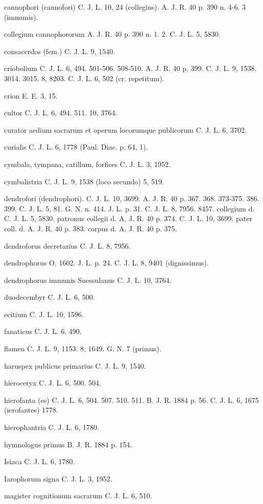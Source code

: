 \documentclass[a4paper, 11pt, oneside, polutonikogreek, german]{article}
\begin{document}
cannophori (cannofori) C. J. L. 10, 24 (collegius). A. J. R. 40 p. 390 n. 4-6. 3 (immunis).

collegium cannophororum A. J. R. 40 p. 390 n. 1. 2. C. J. L. 5, 5830.

consacerdos (fem.) C. J. L. 9, 1540.

criobolium C. J. L. 6, 494. 501-506. 508-510. A. J. R. 40 p. 399. C. J. L. 9, 1538. 3014. 3015. 8, 8203. C. J. L. 6, 502 (cr. repetitum).

crion E. E. 3, 15.

cultor C. J. L. 6, 494. 511. 10, 3764.

curator aedium sacrarum et operum locorumque publicorum C. J. L. 6, 3702.

curialis C. J. L. 6, 1778 (Paul. Diac. p. 64, 1).

cymbala, tympana, catillum, forfices C. J. L. 3, 1952.

cymbalistria C. J. L. 9, 1538 (loco secundo) 5, 519.

dendrofori (dendrophori). C. J. L. 10, 3699. A. J. R. 40 p. 367. 368. 373-375. 386. 399. C. J. L. 5, 81. G. N. n. 414. J. L. p. 31. C. J. L. 8, 7956. 8457. collegium d. C. J. L. 5, 5830. patronus collegii d. A. J. R. 40 p. 374. C. J. L. 10, 3699. pater coll. d. A. J. R. 40 p. 383. corpus d. A. J. R. 40 p. 375.

dendroforus decretarius C. J. L. 8, 7956.

dendrophorus O. 1602. J. L. p. 24. C. J. L. 8, 9401 (dignissimus).

dendrophorus immunis Suessulanus C. J. L. 10, 3764.

duodecembyr C. J. L. 6, 500.

ecitium C. J. L. 10, 1596.

fanaticus C. J. L. 6, 490.

flamen C. J. L. 9, 1153. 8, 1649. G. N. 7 (primus).

haruspex publicus primarius C. J. L. 9, 1540.

hieroceryx C. J. L. 6, 500. 504.

hierofanta (es) C. J. L. 6, 504. 507. 510. 511. B. J. R. 1884 p. 56. C. J. L. 6, 1675 (ierofantes) 1778.

hierophantria C. J. L. 6, 1780.

hymnologus primus B. J. R. 1884 p. 154.

Isiaca C. J. L. 6, 1780.

Iarophorum signa C. J. L. 3, 1952.

magister cognitionum sacrarum C. J. L. 6, 510.
\end{document}

